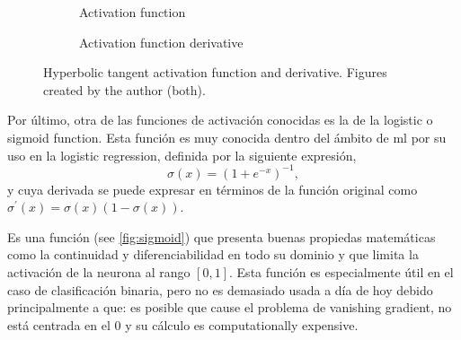 \begin{figure}[ht]
  \centering
  \begin{subfigure}[b]{.375\textwidth}
    \centering
    \caption{Activation function}
  \end{subfigure}\hspace{3em}
  \begin{subfigure}[b]{.375\textwidth}
    \centering
    \caption{Activation function derivative}
  \end{subfigure}
  \caption[Hyperbolic tangent activation function]{Hyperbolic tangent
    activation function and derivative. Figures created by the author (both).}%
  \label{fig:tangent}
\end{figure}

Por último, otra de las funciones de activación conocidas es la de la
logistic o sigmoid function. Esta función es muy conocida dentro del ámbito de \gls{ml} por su
uso en la logistic regression, definida por la
siguiente expresión,
\begin{equation}
  \sigma(x) = {(1 + e^{-x})}^{-1},
\end{equation}
y cuya derivada se puede expresar en términos de la función original como
\(\sigma^\prime(x) = \sigma(x)(1 - \sigma(x))\).

Es una función (see \vref{fig:sigmoid}) que presenta buenas propiedas
matemáticas como la continuidad y diferenciabilidad en todo su dominio y que
limita la activación de la neurona al rango \([0, 1]\). Esta función es
especialmente útil en el caso de clasificación binaria, pero no es demasiado
usada a día de hoy debido principalmente a que: es posible que cause el
problema de vanishing gradient, no está centrada en el \(0\) y su cálculo es
computationally expensive.

